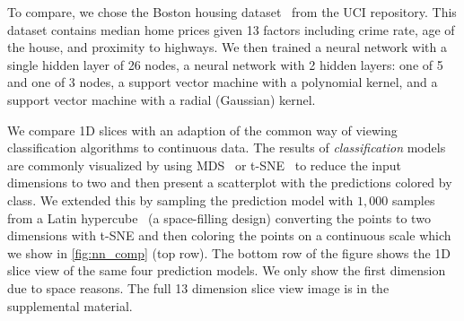 To compare, we chose the Boston housing dataset~\cite{Lichman:2013} from the
UCI repository. This dataset contains median home prices
given 13 factors including crime rate, age of the house, and proximity to
highways. We then trained a neural network with a single hidden layer of 26
nodes, a neural network with 2 hidden layers: one of 5 and one of 3 nodes, a
support vector machine with a polynomial kernel, and a support vector machine
with a radial (Gaussian) kernel.

We compare 1D slices with an adaption of the common way of viewing
classification algorithms to continuous data.
The results of \emph{classification} models are commonly visualized
by using MDS~\cite{Kruskal:1964} or t-SNE~\cite{Maaten:2008} to reduce the input
dimensions to two and then present a scatterplot with the predictions colored
by class. We extended this by sampling the prediction model with \(1,000\)
samples from a Latin hypercube~\cite{Tang:1993} (a space-filling design)
converting the points to two dimensions with t-SNE and then coloring the points
on a continuous scale which we show in \autoref{fig:nn_comp} (top row).  The
bottom row of the figure shows the 1D slice view of the same four prediction
models. We only show the first dimension due to space reasons. The full 13
dimension slice view image is in the supplemental material.

